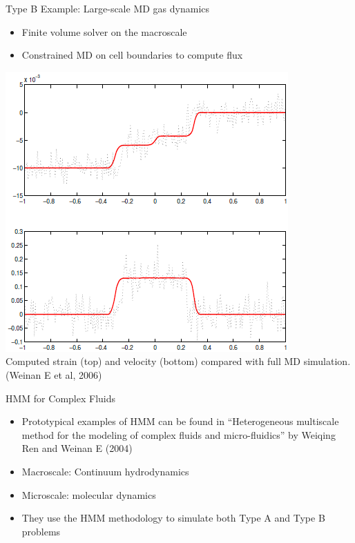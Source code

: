 \documentclass{beamer}
\begin{document}
	\begin{frame}[t]{Type B Example: Large-scale MD gas dynamics}
		\begin{itemize}
			\item  Finite volume solver on the macroscale\vspace{1em}
			\item  Constrained MD on cell boundaries to compute flux
		\end{itemize}
		\begin{center}
			\includegraphics[height=0.65\textheight]{typeB.png}
			\\\tiny Computed strain (top) and velocity (bottom) compared with full MD simulation. (Weinan E et al, 2006)
		\end{center}
	\end{frame}
	
	\begin{frame}{HMM for Complex Fluids}
		\begin{itemize}
			\item Prototypical examples of HMM can be found in ``Heterogeneous multiscale method for the modeling of complex fluids and micro-fluidics'' by Weiqing Ren and Weinan E (2004)\vspace{1em}
			\item Macroscale: Continuum hydrodynamics\vspace{1em}
			\item Microscale: molecular dynamics\vspace{1em}
			\item They use the HMM methodology to simulate both Type A and Type B problems
		\end{itemize}
		
	\end{frame}
	
\end{document}
